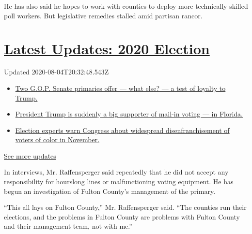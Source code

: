 He has also said he hopes to work with counties to deploy more
technically skilled poll workers. But legislative remedies stalled amid
partisan rancor.

\hypertarget{latest-updates-2020-election}{%
\section{\texorpdfstring{\href{https://www.nytimes.com/2020/08/04/us/elections/primary-election-michigan-arizona-kansas.html?action=click\&pgtype=Article\&state=default\&region=MAIN_CONTENT_1\&context=storylines_live_updates}{Latest
Updates: 2020
Election}}{Latest Updates: 2020 Election}}\label{latest-updates-2020-election}}

Updated 2020-08-04T20:32:48.543Z

\begin{itemize}
\tightlist
\item
  \href{https://www.nytimes.com/2020/08/04/us/elections/primary-election-michigan-arizona-kansas.html?action=click\&pgtype=Article\&state=default\&region=MAIN_CONTENT_1\&context=storylines_live_updates\#link-3924dd44}{Two
  G.O.P. Senate primaries offer --- what else? --- a test of loyalty to
  Trump.}
\item
  \href{https://www.nytimes.com/2020/08/04/us/elections/primary-election-michigan-arizona-kansas.html?action=click\&pgtype=Article\&state=default\&region=MAIN_CONTENT_1\&context=storylines_live_updates\#link-32b39e33}{President
  Trump is suddenly a big supporter of mail-in voting --- in Florida.}
\item
  \href{https://www.nytimes.com/2020/08/04/us/elections/primary-election-michigan-arizona-kansas.html?action=click\&pgtype=Article\&state=default\&region=MAIN_CONTENT_1\&context=storylines_live_updates\#link-6d019753}{Election
  experts warn Congress about widespread disenfranchisement of voters of
  color in November.}
\end{itemize}

\href{https://www.nytimes.com/2020/08/04/us/elections/primary-election-michigan-arizona-kansas.html?action=click\&pgtype=Article\&state=default\&region=MAIN_CONTENT_1\&context=storylines_live_updates}{See
more updates}

In interviews, Mr. Raffensperger said repeatedly that he did not accept
any responsibility for hourslong lines or malfunctioning voting
equipment. He has begun an investigation of Fulton County's management
of the primary.

``This all lays on Fulton County,'' Mr. Raffensperger said. ``The
counties run their elections, and the problems in Fulton County are
problems with Fulton County and their management team, not with me.''

